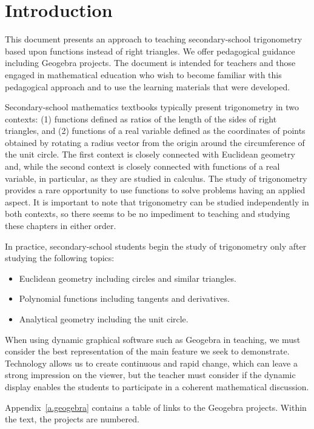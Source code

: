 \section{Introduction}

This document presents an approach to teaching secondary-school trigonometry based upon functions instead of right triangles.
We offer pedagogical guidance including Geogebra projects.
The document is intended for teachers and those engaged in mathematical education who wish to become familiar with this pedagogical approach and to use the learning materials that were developed.

Secondary-school mathematics textbooks typically present trigonometry in two contexts: (1) functions defined as ratios of the length of the sides of right triangles, and (2) functions of a real variable defined as the coordinates of points obtained by rotating a radius vector from the origin around the circumference of the unit circle.
The first context is closely connected with Euclidean geometry and, while the second context is closely connected with functions of a real variable, in particular, as they are studied in calculus.
The study of trigonometry provides a rare opportunity to use functions to solve problems having an applied aspect.
It is important to note that trigonometry can be studied independently in both contexts, so there seems to be no impediment to teaching and studying these chapters in either order.

In practice, secondary-school students begin the study of trigonometry only after studying the following topics:
\begin{itemize}
\item Euclidean geometry including circles and similar triangles.
\item Polynomial functions including tangents and derivatives.
\item Analytical geometry including the unit circle.
\end{itemize}

When using dynamic graphical software such as Geogebra in teaching, we must consider the best representation of the main feature we seek to demonstrate.
Technology allows us to create continuous and rapid change, which can leave a strong impression on the viewer, but the teacher must consider if the dynamic display enables the students to participate in a coherent mathematical discussion.

Appendix~\ref{a.geogebra} contains a table of links to the Geogebra projects. Within the text, the projects are numbered.
